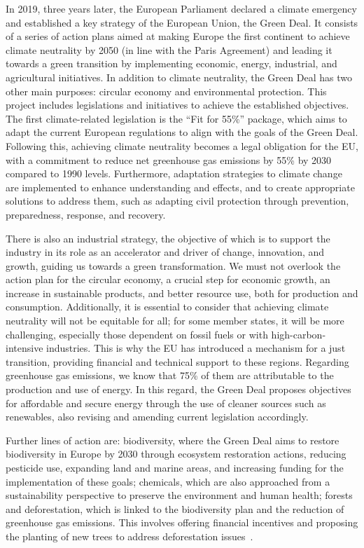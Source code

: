 In 2019, three years later, the European Parliament declared a climate emergency and established a key strategy of the European Union, the Green Deal. It consists of a series of action plans aimed at making Europe the first continent to achieve climate neutrality by 2050 (in line with the Paris Agreement) and leading it towards a green transition by implementing economic, energy, industrial, and agricultural initiatives. In addition to climate neutrality, the Green Deal has two other main purposes: circular economy and environmental protection. This project includes legislations and initiatives to achieve the established objectives. The first climate-related legislation is the “Fit for 55\%” package, which aims to adapt the current European regulations to align with the goals of the Green Deal. Following this, achieving climate neutrality becomes a legal obligation for the EU, with a commitment to reduce net greenhouse gas emissions by 55\% by 2030 compared to 1990 levels. Furthermore, adaptation strategies to climate change are implemented to enhance understanding and effects, and to create appropriate solutions to address them, such as adapting civil protection through prevention, preparedness, response, and recovery.

There is also an industrial strategy, the objective of which is to support the industry in its role as an accelerator and driver of change, innovation, and growth, guiding us towards a green transformation. We must not overlook the action plan for the circular economy, a crucial step for economic growth, an increase in sustainable products, and better resource use, both for production and consumption. Additionally, it is essential to consider that achieving climate neutrality will not be equitable for all; for some member states, it will be more challenging, especially those dependent on fossil fuels or with high-carbon-intensive industries. This is why the EU has introduced a mechanism for a just transition, providing financial and technical support to these regions. Regarding greenhouse gas emissions, we know that 75\% of them are attributable to the production and use of energy. In this regard, the Green Deal proposes objectives for affordable and secure energy through the use of cleaner sources such as renewables, also revising and amending current legislation accordingly.

Further lines of action are: biodiversity, where the Green Deal aims to restore biodiversity in Europe by 2030 through ecosystem restoration actions, reducing pesticide use, expanding land and marine areas, and increasing funding for the implementation of these goals; chemicals, which are also approached from a sustainability perspective to preserve the environment and human health; forests and deforestation, which is linked to the biodiversity plan and the reduction of greenhouse gas emissions. This involves offering financial incentives and proposing the planting of new trees to address deforestation issues~\parencite{green_deal}.

